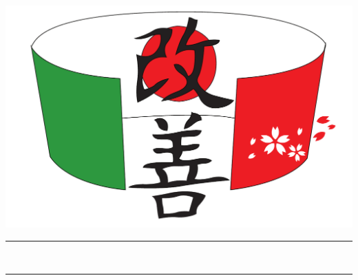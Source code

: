 \begin{titlepage}
  \begin{center}
    {\fontsize{2 cm}{1em}\selectfont \groupname} \\ [3 cm]
    \includegraphics[scale=0.6]{Pics/Logo} \\ [4 cm]

    \hrule
    \vspace{2 mm}
    \Huge{\projectname} \\
    \Large{\doctitle}
    \vspace{2 mm}
    \hrule

  \end{center}
\end{titlepage}
